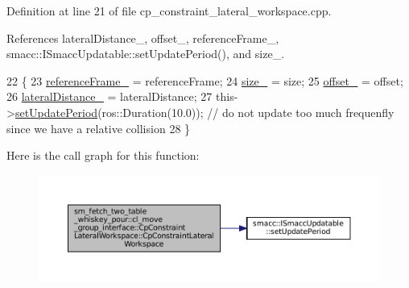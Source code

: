 Definition at line 21 of file cp\+\_\+constraint\+\_\+lateral\+\_\+workspace.\+cpp.



References lateral\+Distance\+\_\+, offset\+\_\+, reference\+Frame\+\_\+, smacc\+::\+I\+Smacc\+Updatable\+::set\+Update\+Period(), and size\+\_\+.


\begin{DoxyCode}
22         \{
23             \hyperlink{classsm__fetch__two__table__whiskey__pour_1_1cl__move__group__interface_1_1CpConstraintLateralWorkspace_af3a787dd9bdfa58d57270935af39b69b}{referenceFrame\_} = referenceFrame;
24             \hyperlink{classsm__fetch__two__table__whiskey__pour_1_1cl__move__group__interface_1_1CpConstraintLateralWorkspace_a5d475923640591717dff98683928e89f}{size\_} = size;
25             \hyperlink{classsm__fetch__two__table__whiskey__pour_1_1cl__move__group__interface_1_1CpConstraintLateralWorkspace_ad3f79b0730471f65189d3bbb87f0352e}{offset\_} = offset;
26             \hyperlink{classsm__fetch__two__table__whiskey__pour_1_1cl__move__group__interface_1_1CpConstraintLateralWorkspace_a15837ea9dc13b9da1cb94a85ba1c04d2}{lateralDistance\_} = lateralDistance;
27             this->\hyperlink{classsmacc_1_1ISmaccUpdatable_a88f3b092a81b2d8810a9776c8c69855b}{setUpdatePeriod}(ros::Duration(10.0)); \textcolor{comment}{// do not update too much frequenfly
       since we have a relative collision}
28         \}
\end{DoxyCode}
Here is the call graph for this function\+:
\nopagebreak
\begin{figure}[H]
\begin{center}
\leavevmode
\includegraphics[width=350pt]{classsm__fetch__two__table__whiskey__pour_1_1cl__move__group__interface_1_1CpConstraintLateralWorkspace_ad712438e666a53378b467fde5bf0ee38_cgraph}
\end{center}
\end{figure}


